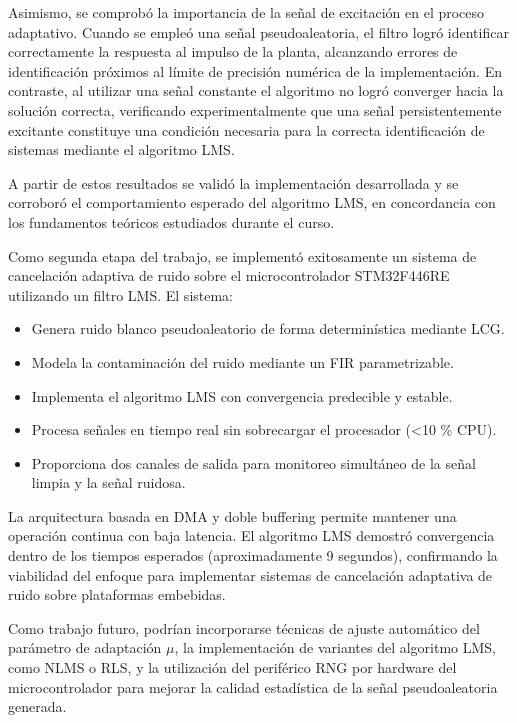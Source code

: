 \documentclass[12pt]{article}
\begin{document}
		Asimismo, se comprobó la importancia de la señal de excitación en el proceso adaptativo. Cuando se empleó una señal pseudoaleatoria, el filtro logró identificar correctamente la respuesta al impulso de la planta, alcanzando errores de identificación próximos al límite de precisión numérica de la implementación. En contraste, al utilizar una señal constante el algoritmo no logró converger hacia la solución correcta, verificando experimentalmente que una señal persistentemente excitante constituye una condición necesaria para la correcta identificación de sistemas mediante el algoritmo LMS.

		A partir de estos resultados se validó la implementación desarrollada y se corroboró el comportamiento esperado del algoritmo LMS, en concordancia con los fundamentos teóricos estudiados durante el curso.

		Como segunda etapa del trabajo, se implementó exitosamente un sistema de cancelación adaptiva de ruido sobre el microcontrolador STM32F446RE utilizando un filtro LMS. El sistema:

		\begin{itemize}
			\item Genera ruido blanco pseudoaleatorio de forma determinística mediante LCG.
			\item Modela la contaminación del ruido mediante un FIR parametrizable.
			\item Implementa el algoritmo LMS con convergencia predecible y estable.
			\item Procesa señales en tiempo real sin sobrecargar el procesador (<10 \% CPU).
			\item Proporciona dos canales de salida para monitoreo simultáneo de la señal limpia y la señal ruidosa.
		\end{itemize}

		La arquitectura basada en DMA y doble buffering permite mantener una operación continua con baja latencia. El algoritmo LMS demostró convergencia dentro de los tiempos esperados (aproximadamente 9 segundos), confirmando la viabilidad del enfoque para implementar sistemas de cancelación adaptativa de ruido sobre plataformas embebidas.

		Como trabajo futuro, podrían incorporarse técnicas de ajuste automático del parámetro de adaptación $\mu$, la implementación de variantes del algoritmo LMS, como NLMS o RLS, y la utilización del periférico RNG por hardware del microcontrolador para mejorar la calidad estadística de la señal pseudoaleatoria generada.
\end{document}

